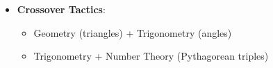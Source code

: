 \documentclass[12pt]{article}
\begin{document}
\begin{tacticalbox}
\begin{itemize}[leftmargin=*]
\begin{itemize}
        \item \textbf{Primitive Pythagorean Triples}:
        \begin{itemize}
            \item Sides are coprime (GCD = 1)
            \item Generated by Euclid's formula: $(m^2 - n^2, 2mn, m^2 + n^2)$ where $m > n$, $\gcd(m,n) = 1$
            \item Common triples: $(3,4,5)$, $(5,12,13)$, $(8,15,17)$, $(7,24,25)$, $(20,21,29)$, $(9,40,41)$, $(12,35,37)$, $(11,60,61)$, $(13,84,85)$, $(33,56,65)$
        \end{itemize}
    \end{itemize}
    
    \item \textbf{Crossover Tactics}:
    \begin{itemize}
        \item Geometry (triangles) + Trigonometry (angles)
        \item Trigonometry + Number Theory (Pythagorean triples)
    \end{itemize}
\end{itemize}
\end{tacticalbox}
\end{document}
